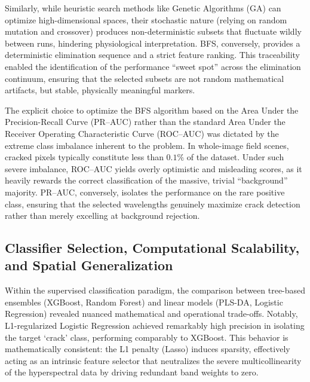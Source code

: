 \medskip\noindent
Similarly, while heuristic search methods like Genetic Algorithms (GA) can optimize high-dimensional spaces, their stochastic nature (relying on random mutation and crossover) produces non-deterministic subsets that fluctuate wildly between runs, hindering physiological interpretation. BFS, conversely, provides a deterministic elimination sequence and a strict feature ranking. This traceability enabled the identification of the performance ``sweet spot'' across the elimination continuum, ensuring that the selected subsets are not random mathematical artifacts, but stable, physically meaningful markers.

\medskip\noindent
The explicit choice to optimize the BFS algorithm based on the Area Under the Precision-Recall Curve (PR--AUC) rather than the standard Area Under the Receiver Operating Characteristic Curve (ROC--AUC) was dictated by the extreme class imbalance inherent to the problem. In whole-image field scenes, cracked pixels typically constitute less than $0.1\%$ of the dataset. Under such severe imbalance, ROC--AUC yields overly optimistic and misleading scores, as it heavily rewards the correct classification of the massive, trivial ``background'' majority. PR--AUC, conversely, isolates the performance on the rare positive class, ensuring that the selected wavelengths genuinely maximize crack detection rather than merely excelling at background rejection.

\newpage
\subsection{Classifier Selection, Computational Scalability, and Spatial Generalization}
\noindent
Within the supervised classification paradigm, the comparison between tree-based ensembles (XGBoost, Random Forest) and linear models (PLS-DA, Logistic Regression) revealed nuanced mathematical and operational trade-offs. Notably, L1-regularized Logistic Regression achieved remarkably high precision in isolating the target `crack' class, performing comparably to XGBoost. This behavior is mathematically consistent: the L1 penalty (Lasso) induces sparsity, effectively acting as an intrinsic feature selector that neutralizes the severe multicollinearity of the hyperspectral data by driving redundant band weights to zero. 


